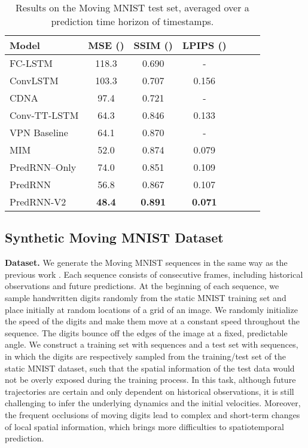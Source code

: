 \documentclass[10pt,journal,compsoc]{IEEEtran}
\let\MYoriglatexcaption\caption
\renewcommand{\caption}[2][\relax]{\MYoriglatexcaption[#2]{#2}}
\newcommand{\myparagraph}[1]{\vspace{5pt} \noindent \textbf{#1.}}
\begin{document}
\begin{table}[b]
  \caption{Results on the Moving MNIST test set, averaged over a prediction time horizon of  timestamps. }
  \vskip -0.05in
  \label{tab:mnist_mse}
  \centering
  \renewcommand{\multirowsetup}{\centering}  
  \begin{tabular}{lcccccc}
    \toprule
    Model & MSE () & SSIM () & LPIPS ()  \\
    \midrule
    FC-LSTM \cite{srivastava2015unsupervised} & 118.3 &0.690 &  - \\
    ConvLSTM \cite{shi2015convolutional} & 103.3& 0.707  & 0.156 \\
    CDNA \cite{Finn2016Unsupervised} & 97.4& 0.721  & - \\
Conv-TT-LSTM \cite{su2020convolutional} & 64.3 & 0.846  & 0.133 \\
    VPN Baseline \cite{Kalchbrenner2016Video} & 64.1& 0.870  & -\\
    MIM \cite{wang2019memory} & 52.0 & 0.874 & 0.079 \\
    \midrule
    PredRNN--Only & 74.0 & 0.851 & 0.109 \\
    PredRNN & 56.8 & 0.867 & 0.107 \\
    PredRNN-V2 & \textbf{48.4} & \textbf{0.891} & \textbf{0.071}\\
    \bottomrule
  \end{tabular}
\end{table}


\subsection{Synthetic Moving MNIST Dataset}
\label{sec:mnist}

\myparagraph{Dataset} We generate the Moving MNIST sequences in the same way as the previous work \cite{srivastava2015unsupervised,shi2015convolutional}. Each sequence consists of  consecutive frames, including  historical observations and  future predictions. At the beginning of each sequence, we sample  handwritten digits randomly from the static MNIST training set and place initially at random locations of a  grid of an image. We randomly initialize the speed of the digits and make them move at a constant speed throughout the sequence. The digits bounce off the edges of the image at a fixed, predictable angle. 
We construct a training set with  sequences and a test set with  sequences, in which the digits are respectively sampled from the training/test set of the static MNIST dataset, such that the spatial information of the test data would not be overly exposed during the training process.
In this task, although future trajectories are certain and only dependent on historical observations, it is still challenging to infer the underlying dynamics and the initial velocities. 
Moreover, the frequent occlusions of moving digits lead to complex and short-term changes of local spatial information, which brings more difficulties to spatiotemporal prediction.
\end{document}
